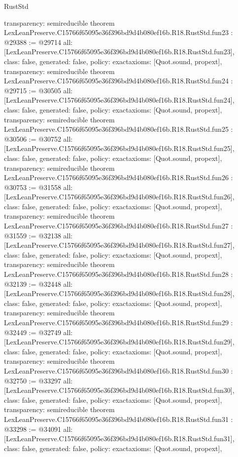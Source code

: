 \begin{lexlean}{RustStd}
\begin{coremodule}
{  transparency: semireducible
}
theorem LexLeanPreserve.C15766f65095e36f396bd9d4b080ef16b.R18.RustStd.fun23 : @29388 := @29714 {
  all: [LexLeanPreserve.C15766f65095e36f396bd9d4b080ef16b.R18.RustStd.fun23],
  class: false,
  generated: false,
  policy: exact{axioms: [Quot.sound, propext]},
  transparency: semireducible
}
theorem LexLeanPreserve.C15766f65095e36f396bd9d4b080ef16b.R18.RustStd.fun24 : @29715 := @30505 {
  all: [LexLeanPreserve.C15766f65095e36f396bd9d4b080ef16b.R18.RustStd.fun24],
  class: false,
  generated: false,
  policy: exact{axioms: [Quot.sound, propext]},
  transparency: semireducible
}
theorem LexLeanPreserve.C15766f65095e36f396bd9d4b080ef16b.R18.RustStd.fun25 : @30506 := @30752 {
  all: [LexLeanPreserve.C15766f65095e36f396bd9d4b080ef16b.R18.RustStd.fun25],
  class: false,
  generated: false,
  policy: exact{axioms: [Quot.sound, propext]},
  transparency: semireducible
}
theorem LexLeanPreserve.C15766f65095e36f396bd9d4b080ef16b.R18.RustStd.fun26 : @30753 := @31558 {
  all: [LexLeanPreserve.C15766f65095e36f396bd9d4b080ef16b.R18.RustStd.fun26],
  class: false,
  generated: false,
  policy: exact{axioms: [Quot.sound, propext]},
  transparency: semireducible
}
theorem LexLeanPreserve.C15766f65095e36f396bd9d4b080ef16b.R18.RustStd.fun27 : @31559 := @32138 {
  all: [LexLeanPreserve.C15766f65095e36f396bd9d4b080ef16b.R18.RustStd.fun27],
  class: false,
  generated: false,
  policy: exact{axioms: [Quot.sound, propext]},
  transparency: semireducible
}
theorem LexLeanPreserve.C15766f65095e36f396bd9d4b080ef16b.R18.RustStd.fun28 : @32139 := @32448 {
  all: [LexLeanPreserve.C15766f65095e36f396bd9d4b080ef16b.R18.RustStd.fun28],
  class: false,
  generated: false,
  policy: exact{axioms: [Quot.sound, propext]},
  transparency: semireducible
}
theorem LexLeanPreserve.C15766f65095e36f396bd9d4b080ef16b.R18.RustStd.fun29 : @32449 := @32749 {
  all: [LexLeanPreserve.C15766f65095e36f396bd9d4b080ef16b.R18.RustStd.fun29],
  class: false,
  generated: false,
  policy: exact{axioms: [Quot.sound, propext]},
  transparency: semireducible
}
theorem LexLeanPreserve.C15766f65095e36f396bd9d4b080ef16b.R18.RustStd.fun30 : @32750 := @33297 {
  all: [LexLeanPreserve.C15766f65095e36f396bd9d4b080ef16b.R18.RustStd.fun30],
  class: false,
  generated: false,
  policy: exact{axioms: [Quot.sound, propext]},
  transparency: semireducible
}
theorem LexLeanPreserve.C15766f65095e36f396bd9d4b080ef16b.R18.RustStd.fun31 : @33298 := @34091 {
  all: [LexLeanPreserve.C15766f65095e36f396bd9d4b080ef16b.R18.RustStd.fun31],
  class: false,
  generated: false,
  policy: exact{axioms: [Quot.sound, propext]},
}
\end{coremodule}
\end{lexlean}
